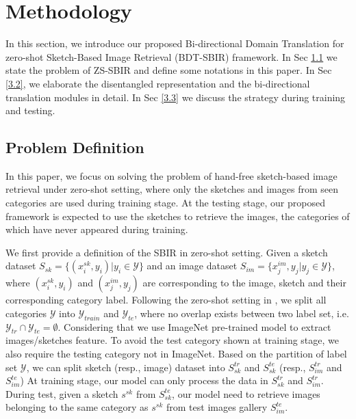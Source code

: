 \documentclass[10pt,twocolumn,letterpaper]{article}
\begin{document}
\section{Methodology}
In this section, we introduce our proposed Bi-directional Domain Translation for zero-shot Sketch-Based Image Retrieval (BDT-SBIR) framework. In Sec \ref{3.1} we state the problem of ZS-SBIR and define some notations in this paper. In Sec \ref{3.2}, we elaborate the disentangled representation and the bi-directional translation modules in detail. In Sec \ref{3.3} we discuss the strategy during training and testing.

\subsection{Problem Definition} \label{3.1}
In this paper, we focus on solving the problem of hand-free sketch-based image retrieval under zero-shot setting, where only the sketches and images from seen categories are used during training stage. 
At the testing stage, our proposed framework is expected to use the sketches to retrieve the images, the categories of which have never appeared during training.

We first provide a definition of the SBIR in zero-shot setting. 
Given a sketch dataset $S_{sk}=\{(x_i^{sk}, y_i)|y_i \in \mathcal{Y}\}$ and an image dataset $S_{im}=\{x_j^{im}, y_j | y_j \in \mathcal{Y}\}$, where $(x_i^{sk}, y_i)$ and $(x_j^{im}, y_j)$ are corresponding to the image, sketch and their corresponding category label.
Following the zero-shot setting in \cite{yelamarthi2018zero,wang2019stacked}, we split all categories $\mathcal{Y}$ into $\mathcal{Y}_{train}$ and $\mathcal{Y}_{te}$, where no overlap exists between two label set, i.e. $\mathcal{Y}_{tr} \cap \mathcal{Y}_{te} = \emptyset$. Considering that we use ImageNet pre-trained model to extract images/sketches feature. To avoid the test category shown at training stage, we also require the testing category not in ImageNet.
Based on the partition of label set $\mathcal{Y}$, we can split sketch (resp., image) dataset into $S^{tr}_{sk}$ and $S^{te}_{sk}$ (resp., $S^{tr}_{im}$ and $S^{te}_{im}$)
At training stage, our model can only process the data in $S^{tr}_{sk}$ and $S_{im}^{tr}$. 
During test, given a sketch $s^{sk}$ from $S^{te}_{sk}$, our model need to retrieve images belonging to the same category as $s^{sk}$ from test images gallery $S^{te}_{im}$.

\end{document}

